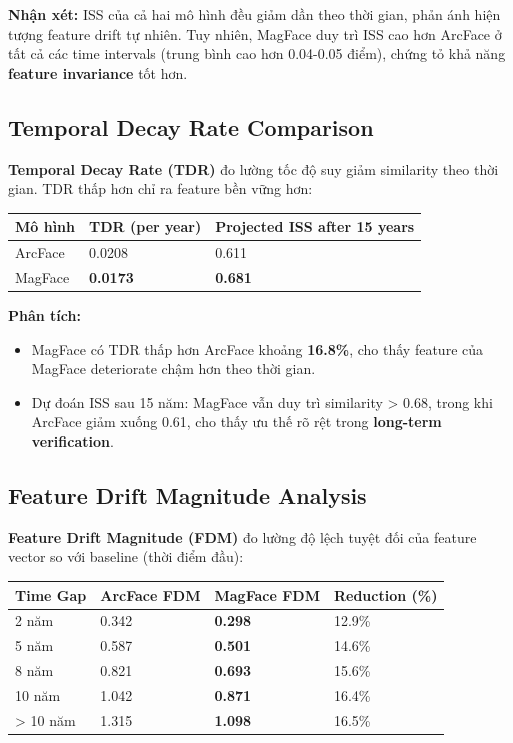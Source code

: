 \textbf{Nhận xét:} ISS của cả hai mô hình đều giảm dần theo thời gian, phản ánh hiện tượng feature drift tự nhiên. Tuy nhiên, MagFace duy trì ISS cao hơn ArcFace ở tất cả các time intervals (trung bình cao hơn 0.04-0.05 điểm), chứng tỏ khả năng \textbf{feature invariance} tốt hơn.

\subsection{Temporal Decay Rate Comparison}

\textbf{Temporal Decay Rate (TDR)} đo lường tốc độ suy giảm similarity theo thời gian. TDR thấp hơn chỉ ra feature bền vững hơn:

\vspace{0.3cm}
\noindent\begin{tabularx}{\textwidth}{|X|X|X|}
\hline
\textbf{Mô hình} & \textbf{TDR (per year)} & \textbf{Projected ISS after 15 years} \\
\hline
ArcFace & 0.0208 & 0.611 \\
\hline
MagFace & \textbf{0.0173} & \textbf{0.681} \\
\hline
\end{tabularx}
\vspace{0.3cm}

\textbf{Phân tích:}
\begin{itemize}
    \item MagFace có TDR thấp hơn ArcFace khoảng \textbf{16.8\%}, cho thấy feature của MagFace deteriorate chậm hơn theo thời gian.
    \item Dự đoán ISS sau 15 năm: MagFace vẫn duy trì similarity > 0.68, trong khi ArcFace giảm xuống 0.61, cho thấy ưu thế rõ rệt trong \textbf{long-term verification}.
\end{itemize}

\subsection{Feature Drift Magnitude Analysis}

\textbf{Feature Drift Magnitude (FDM)} đo lường độ lệch tuyệt đối của feature vector so với baseline (thời điểm đầu):

\vspace{0.3cm}
\noindent\begin{tabularx}{\textwidth}{|X|X|X|X|}
\hline
\textbf{Time Gap} & \textbf{ArcFace FDM} & \textbf{MagFace FDM} & \textbf{Reduction (\%)} \\
\hline
2 năm & 0.342 & \textbf{0.298} & 12.9\% \\
\hline
5 năm & 0.587 & \textbf{0.501} & 14.6\% \\
\hline
8 năm & 0.821 & \textbf{0.693} & 15.6\% \\
\hline
10 năm & 1.042 & \textbf{0.871} & 16.4\% \\
\hline
> 10 năm & 1.315 & \textbf{1.098} & 16.5\% \\
\hline
\end{tabularx}
\vspace{0.3cm}

